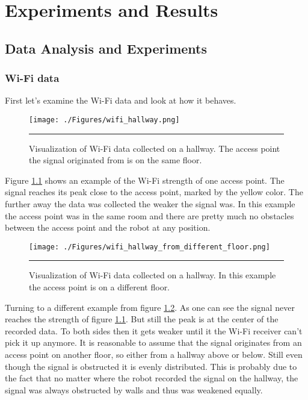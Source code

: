 \chapter{Experiments and Results} %
\label{Chapter4}

\section{Data Analysis and Experiments}
\subsection{Wi-Fi data}
First let's examine the Wi-Fi data and look at how it behaves. 
\begin{figure}[htbp]
	\centering
		\texttt{[image: ./Figures/wifi\_hallway.png]}
		\rule{35em}{0.5pt}
	\caption[Hallway Wi-Fi data]{Visualization of Wi-Fi data collected on a hallway. The access point the signal originated from is on the same floor.}
	\label{fig:hallway_same_floor_wifi}
\end{figure}
Figure \ref{fig:hallway_same_floor_wifi} shows an example of the Wi-Fi strength of one access point. The signal reaches its peak close to the access point, marked by the yellow color. The further away the data was collected the weaker the signal was. In this example the access point was in the same room and there are pretty much no obstacles between the access point and the robot at any position. 
\begin{figure}[htbp]
	\centering
		\texttt{[image: ./Figures/wifi\_hallway\_from\_different\_floor.png]}
		\rule{35em}{0.5pt}
	\caption[Hallway Wi-Fi data]{Visualization of Wi-Fi data collected on a hallway. In this example the access point is on a different floor.}
	\label{fig:hallway_different_floor_wifi}
\end{figure}
Turning to a different example from figure \ref{fig:hallway_different_floor_wifi}. As one can see the signal never reaches the strength of figure \ref{fig:hallway_same_floor_wifi}. But still the peak is at the center of the recorded data. To both sides then it gets weaker until it the Wi-Fi receiver can't pick it up anymore. It is reasonable to assume that the signal originates from an access point on another floor, so either from a hallway above or below. Still even though the signal is obstructed it is evenly distributed. This is probably due to the fact that no matter where the robot recorded the signal on the hallway, the signal was always obstructed by walls and thus was weakened equally. 

